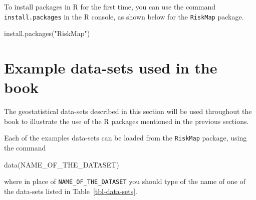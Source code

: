 \documentclass[
  letterpaper,
]{krantz}
\newenvironment{Shaded}{\begin{snugshade}}{\end{snugshade}}
\newcommand{\FunctionTok}[1]{\textcolor[rgb]{0.28,0.35,0.67}{#1}}
\newcommand{\NormalTok}[1]{\textcolor[rgb]{0.00,0.23,0.31}{#1}}
\newcommand{\StringTok}[1]{\textcolor[rgb]{0.13,0.47,0.30}{#1}}
\begin{document}
To install packages in R for the first time, you can use the command
\texttt{install.packages} in the R console, as shown below for the
\texttt{RiskMap} package.

\begin{Shaded}
\begin{Highlighting}[]
\FunctionTok{install.packages}\NormalTok{(}\StringTok{"RiskMap"}\NormalTok{)}
\end{Highlighting}
\end{Shaded}

\hypertarget{sec-examples-ch1}{%
\section{Example data-sets used in the book}\label{sec-examples-ch1}}

The geostatistical data-sets described in this section will be used
throughout the book to illustrate the use of the R packages mentioned in
the previous sections.

Each of the examples data-sets can be loaded from the \texttt{RiskMap}
package, using the command

\begin{Shaded}
\begin{Highlighting}[]
\FunctionTok{data}\NormalTok{(NAME\_OF\_THE\_DATASET)}
\end{Highlighting}
\end{Shaded}

where in place of \texttt{NAME\_OF\_THE\_DATASET} you should type of the
name of one of the data-sets listed in Table~\ref{tbl-data-sets}.
\end{document}
